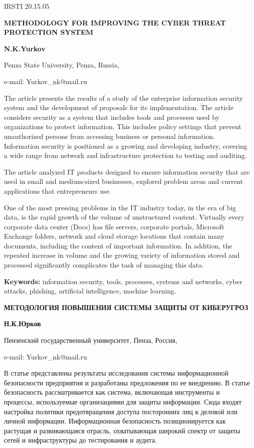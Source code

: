 IRSTI 20.15.05

\textbf{METHODOLOGY FOR IMPROVING THE CYBER THREAT PROTECTION SYSTEM}

\textbf{N.K.Yurkov}

Penza State University, Penza, Russia,

e-mail: Yurkov\_nk@mail.ru

The article presents the results of a study of the enterprise
information security system and the development of proposals for its
implementation. The article considers security as a system that includes
tools and processes used by organizations to protect information. This
includes policy settings that prevent unauthorized persons from
accessing business or personal information. Information security is
positioned as a growing and developing industry, covering a wide range
from network and infrastructure protection to testing and auditing.

The article analyzed IT products designed to ensure information security
that are used in small and medium-sized businesses, explored problem
areas and current applications that entrepreneurs use.

One of the most pressing problems in the IT industry today, in the era
of big data, is the rapid growth of the volume of unstructured content.
Virtually every corporate data center (Docs) has file servers, corporate
portals, Microsoft Exchange folders, network and cloud storage locations
that contain many documents, including the content of important
information. In addition, the repeated increase in volume and the
growing variety of information stored and processed significantly
complicates the task of managing this data.

\textbf{Keywords:} information security, tools, processes, systems and
networks, cyber attacks, phishing, artificial intelligence, machine
learning.

\textbf{МЕТОДОЛОГИЯ ПОВЫШЕНИЯ СИСТЕМЫ ЗАЩИТЫ ОТ КИБЕРУГРОЗ}

\textbf{Н.К.Юрков}

Пензенский государственный университет, Пенза, Россия,

e-mail: Yurkov\_nk@mail.ru

В статье представлены результаты исследования системы информационной
безопасности предприятия и разработаны предложения по ее внедрению. В
статье безопасность рассматривается как система, включающая инструменты
и процессы, используемые организациями для защиты информации. Сюда
входят настройка политики предотвращения доступа посторонних лиц к
деловой или личной информации. Информационная безопасность
позиционируется как растущая и развивающаяся отрасль, охватывающая
широкий спектр от защиты сетей и инфраструктуры до тестирования и
аудита.


